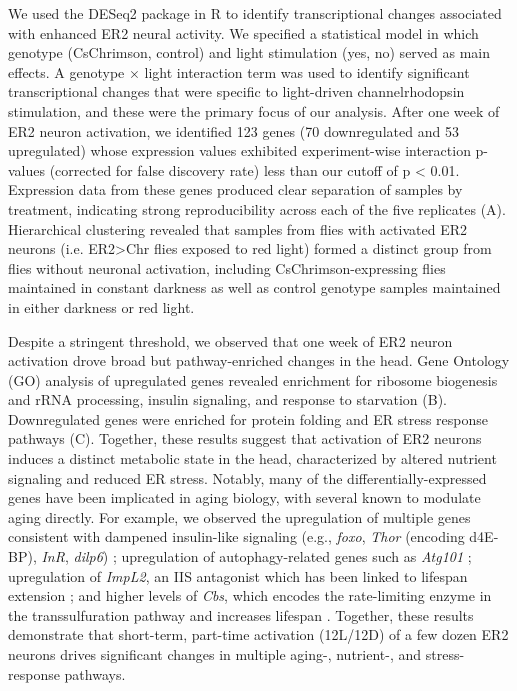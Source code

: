 We used the DESeq2 package in R \citep{love2014} to identify transcriptional changes associated with enhanced ER2 neural activity.
We specified a statistical model in which genotype (CsChrimson, control) and light stimulation (yes, no) served as main effects. 
A genotype $\times$ light interaction term was used to identify significant transcriptional changes that were specific to light-driven channelrhodopsin stimulation, and these were the primary focus of our analysis. 
After one week of ER2 neuron activation, we identified 123 genes (70 downregulated and 53 upregulated) whose expression values exhibited experiment-wise interaction p-values (corrected for false discovery rate) less than our cutoff of p < 0.01. 
Expression data from these genes produced clear separation of samples by treatment, indicating strong reproducibility across each of the five replicates (A). 
Hierarchical clustering revealed that samples from flies with activated ER2 neurons (i.e. ER2>Chr flies exposed to red light) formed a distinct group from flies without neuronal activation, including CsChrimson-expressing flies maintained in constant darkness as well as control genotype samples maintained in either darkness or red light. 

Despite a stringent threshold, we observed that one week of ER2 neuron activation drove broad but pathway-enriched changes in the head. 
Gene Ontology (GO) analysis of upregulated genes revealed enrichment for ribosome biogenesis and rRNA processing, insulin signaling, and response to starvation (B). 
Downregulated genes were enriched for protein folding and ER stress response pathways (C). 
Together, these results suggest that activation of ER2 neurons induces a distinct metabolic state in the head, characterized by altered nutrient signaling and reduced ER stress. 
Notably, many of the differentially-expressed genes have been implicated in aging biology, with several known to modulate aging directly. 
For example, we observed the upregulation of multiple genes consistent with dampened insulin-like signaling (e.g., \textit{foxo}, \textit{Thor} (encoding d4E-BP), \textit{InR}, \textit{dilp6}) \citep{partridge2010}; upregulation of autophagy-related genes such as \textit{Atg101} \citep{guo2019}; upregulation of \textit{ImpL2}, an IIS antagonist which has been linked to lifespan extension \citep{alic2011}; and higher levels of \textit{Cbs}, which encodes the rate-limiting enzyme in the transsulfuration pathway and increases lifespan \citep{kabil2011}. 
Together, these results demonstrate that short-term, part-time activation (12L/12D) of a few dozen ER2 neurons drives significant changes in multiple aging-, nutrient-, and stress-response pathways. 

